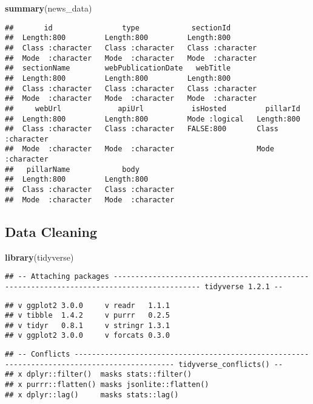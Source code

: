 \documentclass[]{article}
\newenvironment{Shaded}{\begin{snugshade}}{\end{snugshade}}
\newcommand{\KeywordTok}[1]{\textcolor[rgb]{0.13,0.29,0.53}{\textbf{#1}}}
\newcommand{\NormalTok}[1]{#1}
\begin{document}
\begin{Shaded}
\begin{Highlighting}[]
\KeywordTok{summary}\NormalTok{(news_data)}
\end{Highlighting}
\end{Shaded}

\begin{verbatim}
##       id                type            sectionId        
##  Length:800         Length:800         Length:800        
##  Class :character   Class :character   Class :character  
##  Mode  :character   Mode  :character   Mode  :character  
##  sectionName        webPublicationDate   webTitle        
##  Length:800         Length:800         Length:800        
##  Class :character   Class :character   Class :character  
##  Mode  :character   Mode  :character   Mode  :character  
##     webUrl             apiUrl           isHosted         pillarId        
##  Length:800         Length:800         Mode :logical   Length:800        
##  Class :character   Class :character   FALSE:800       Class :character  
##  Mode  :character   Mode  :character                   Mode  :character  
##   pillarName            body          
##  Length:800         Length:800        
##  Class :character   Class :character  
##  Mode  :character   Mode  :character
\end{verbatim}

\subsection{Data Cleaning}\label{data-cleaning}

\begin{Shaded}
\begin{Highlighting}[]
\KeywordTok{library}\NormalTok{(tidyverse)}
\end{Highlighting}
\end{Shaded}

\begin{verbatim}
## -- Attaching packages ------------------------------------------------------------------------------------------ tidyverse 1.2.1 --
\end{verbatim}

\begin{verbatim}
## v ggplot2 3.0.0     v readr   1.1.1
## v tibble  1.4.2     v purrr   0.2.5
## v tidyr   0.8.1     v stringr 1.3.1
## v ggplot2 3.0.0     v forcats 0.3.0
\end{verbatim}

\begin{verbatim}
## -- Conflicts --------------------------------------------------------------------------------------------- tidyverse_conflicts() --
## x dplyr::filter()  masks stats::filter()
## x purrr::flatten() masks jsonlite::flatten()
## x dplyr::lag()     masks stats::lag()
\end{verbatim}
\end{document}
